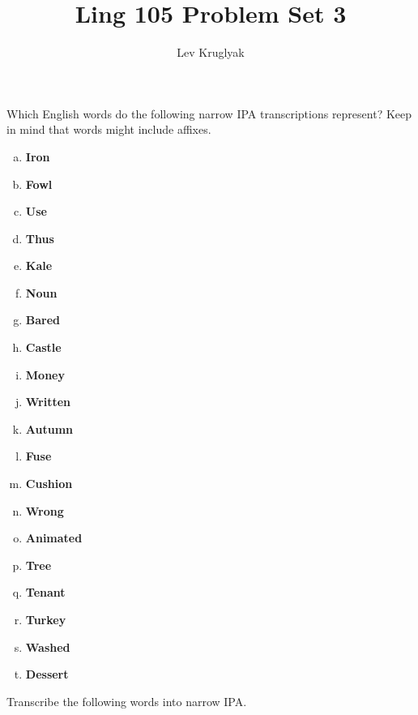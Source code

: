 \documentclass{../../templates/lkx_pset}
\title{Ling 105 Problem Set 3}
\author{Lev Kruglyak}
\begin{document}
\maketitle

\begin{problem}{1}
Which English words do the following narrow IPA transcriptions represent? Keep in mind that words might include affixes.
\end{problem}

\begin{enumerate}[(a)]
  \item \textbf{Iron}
  \item \textbf{Fowl}
  \item \textbf{Use}
  \item \textbf{Thus }
  \item \textbf{Kale}
  \item \textbf{Noun}
  \item \textbf{Bared}
  \item \textbf{Castle}
  \item \textbf{Money}
  \item \textbf{Written}
  \item \textbf{Autumn}
  \item \textbf{Fuse}
  \item \textbf{Cushion}
  \item \textbf{Wrong}
  \item \textbf{Animated}
  \item \textbf{Tree}
  \item \textbf{Tenant}
  \item \textbf{Turkey}
  \item \textbf{Washed}
  \item \textbf{Dessert}
\end{enumerate}

\pagebreak
\begin{problem}{2}
Transcribe the following words into narrow IPA.
\end{problem}
\end{document}
